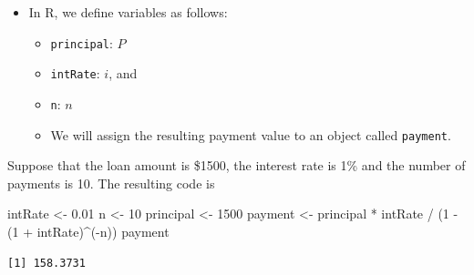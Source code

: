 \documentclass[
  9pt,
  a4paper,
  ignorenonframetext,
  notheorems]{beamer}
\newenvironment{Shaded}{\begin{snugshade}}{\end{snugshade}}
\newcommand{\DecValTok}[1]{\textcolor[rgb]{0.68,0.00,0.00}{#1}}
\newcommand{\FloatTok}[1]{\textcolor[rgb]{0.68,0.00,0.00}{#1}}
\newcommand{\NormalTok}[1]{\textcolor[rgb]{0.00,0.23,0.31}{#1}}
\newcommand{\OtherTok}[1]{\textcolor[rgb]{0.00,0.23,0.31}{#1}}
\newcommand{\SpecialCharTok}[1]{\textcolor[rgb]{0.37,0.37,0.37}{#1}}
\providecommand{\tightlist}{%
  \setlength{\itemsep}{0pt}\setlength{\parskip}{0pt}}\usepackage{longtable,booktabs,array}
\begin{document}
\begin{frame}[fragile]
\begin{itemize}
\tightlist
\item
  In R, we define variables as follows:

  \begin{itemize}
  \tightlist
  \item
    \texttt{principal}: \(P\)
  \item
    \texttt{intRate}: \(i\), and
  \item
    \texttt{n}: \(n\)
  \item
    We will assign the resulting payment value to an object called
    \texttt{payment}.
  \end{itemize}
\end{itemize}

Suppose that the loan amount is \$1500, the interest rate is 1\% and the
number of payments is 10. The resulting code is

\begin{Shaded}
\begin{Highlighting}[]
\NormalTok{intRate }\OtherTok{\textless{}{-}} \FloatTok{0.01}
\NormalTok{n }\OtherTok{\textless{}{-}} \DecValTok{10}
\NormalTok{principal }\OtherTok{\textless{}{-}} \DecValTok{1500}
\NormalTok{payment }\OtherTok{\textless{}{-}}\NormalTok{ principal }\SpecialCharTok{*}\NormalTok{ intRate }\SpecialCharTok{/}\NormalTok{ (}\DecValTok{1} \SpecialCharTok{{-}}\NormalTok{ (}\DecValTok{1} \SpecialCharTok{+}\NormalTok{ intRate)}\SpecialCharTok{\^{}}\NormalTok{(}\SpecialCharTok{{-}}\NormalTok{n))}
\NormalTok{payment}
\end{Highlighting}
\end{Shaded}

\begin{verbatim}
[1] 158.3731
\end{verbatim}
\end{frame}
\end{document}
